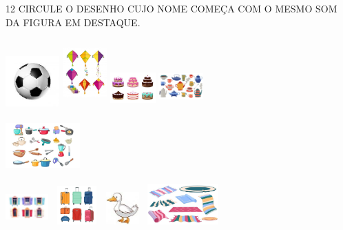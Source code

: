 \num{12} CIRCULE O DESENHO CUJO NOME COMEÇA COM O MESMO SOM DA FIGURA EM DESTAQUE.

\includegraphics[width=0.81250in,height=0.75903in]{media/image49.jpg}
\includegraphics[width=0.67361in,height=1.02083in]{media/image50.jpg}
\includegraphics[width=0.68472in,height=0.56389in]{media/image51.jpg}
\includegraphics[width=0.67014in,height=0.61944in]{media/image52.jpg}

\includegraphics[width=1.12431in,height=0.78125in]{media/image53.jpg}

\includegraphics[width=0.64097in,height=0.53194in]{media/image54.jpg}
\includegraphics[width=0.77778in,height=0.58681in]{media/image55.jpg}
\includegraphics[width=0.50000in,height=0.49583in]{media/image56.jpg}
\includegraphics[width=1.22986in,height=0.61458in]{media/image57.jpg}

